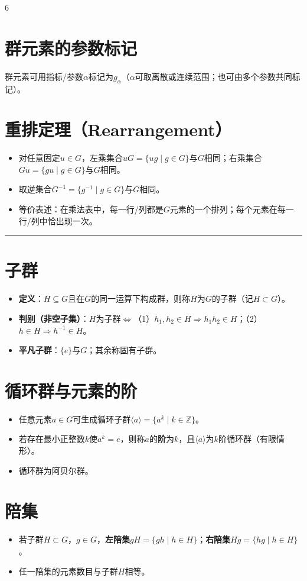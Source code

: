 \documentclass[landscape]{article}
\begin{document}
\begin{multicols*}{6}
\section*{群元素的参数标记}
群元素可用指标/参数$\alpha$标记为$g_{\alpha}$（$\alpha$可取离散或连续范围；也可由多个参数共同标记）。

\section*{重排定理（Rearrangement）}
\begin{itemize}
  \item 对任意固定$u\in G$，左乘集合$uG=\{ug\mid g\in G\}$与$G$相同；右乘集合$Gu=\{gu\mid g\in G\}$与$G$相同。
  \item 取逆集合$G^{-1}=\{g^{-1}\mid g\in G\}$与$G$相同。
  \item 等价表述：在乘法表中，每一行/列都是$G$元素的一个排列；每个元素在每一行/列中恰出现一次。
\end{itemize}
\noindent\textcolor{red}{\rule{\linewidth}{1pt}}
\section*{子群}
\begin{itemize}
  \item \textbf{定义}：$H\subseteq G$且在$G$的同一运算下构成群，则称$H$为$G$的子群（记$H \subset  G$）。
  \item \textbf{判别（非空子集）}：$H$为子群$\Leftrightarrow$（1）$h_1,h_2\in H\Rightarrow h_1h_2\in H$；（2）$h\in H\Rightarrow h^{-1}\in H$。
  \item \textbf{平凡子群}：$\{e\}$与$G$；其余称固有子群。
\end{itemize}

\section*{循环群与元素的阶}
\begin{itemize}
  \item 任意元素$a\in G$可生成循环子群$\langle a\rangle=\{a^k\mid k\in\mathbb{Z}\}$。
  \item 若存在最小正整数$k$使$a^k=e$，则称$a$的\textbf{阶}为$k$，且$\langle a\rangle$为$k$阶循环群（有限情形）。
  \item 循环群为阿贝尔群。
\end{itemize}

\section*{陪集}
\begin{itemize}
  \item 若{\color{red}子群}$H\subset G$，$g\in G$，\textbf{左陪集}$gH=\{gh\mid h\in H\}$；\textbf{右陪集}$Hg=\{hg\mid h\in H\}$。
  \item 任一陪集的元素数目与子群$H$相等。
\end{itemize}


\end{multicols*}
\end{document}
